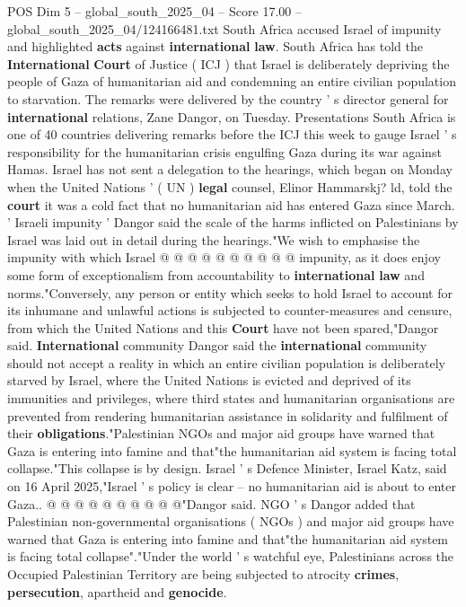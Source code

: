 \begin{textsample}{POS Dim 5 – global\_south\_2025\_04 – Score 17.00 – global\_south\_2025\_04/124166481.txt}  \label{ex:f5_pos_064}
South Africa accused Israel of impunity and highlighted \textbf{acts} against \textbf{international} \textbf{law}.
South Africa has told the \textbf{International} \textbf{Court} of Justice ( ICJ ) that Israel is deliberately depriving the people of Gaza of humanitarian aid and condemning an entire civilian population to starvation.
The remarks were delivered by the country ' s director general for \textbf{international} relations, Zane Dangor, on Tuesday.
Presentations South Africa is one of 40 countries delivering remarks before the ICJ this week to gauge Israel ' s responsibility for the humanitarian crisis engulfing Gaza during its war against Hamas.
Israel has not sent a delegation to the hearings, which began on Monday when the United Nations ' ( UN ) \textbf{legal} counsel, Elinor Hammarskj? ld, told the \textbf{court} it was a cold fact that no humanitarian aid has entered Gaza since March. ' Israeli impunity ' Dangor said the scale of the harms inflicted on Palestinians by Israel was laid out in detail during the hearings."We wish to emphasise the impunity with which Israel @ @ @ @ @ @ @ @ @ @ impunity, as it does enjoy some form of exceptionalism from accountability to \textbf{international} \textbf{law} and norms."Conversely, any person or entity which seeks to hold Israel to account for its inhumane and unlawful actions is subjected to counter-measures and censure, from which the United Nations and this \textbf{Court} have not been spared,"Dangor said. \textbf{International} community Dangor said the \textbf{international} community should not accept a reality in which an entire civilian population is deliberately starved by Israel, where the United Nations is evicted and deprived of its immunities and privileges, where third states and humanitarian organisations are prevented from rendering humanitarian assistance in solidarity and fulfilment of their \textbf{obligations}."Palestinian NGOs and major aid groups have warned that Gaza is entering into famine and that"the humanitarian aid system is facing total collapse."This collapse is by design.
Israel ' s Defence Minister, Israel Katz, said on 16 April 2025,"Israel ' s policy is clear -- no humanitarian aid is about to enter Gaza.. @ @ @ @ @ @ @ @ @ @"Dangor said.
NGO ' s Dangor added that Palestinian non-governmental organisations ( NGOs ) and major aid groups have warned that Gaza is entering into famine and that"the humanitarian aid system is facing total collapse"."Under the world ' s watchful eye, Palestinians across the Occupied Palestinian Territory are being subjected to atrocity \textbf{crimes}, \textbf{persecution}, apartheid and \textbf{genocide}.

\end{textsample}
